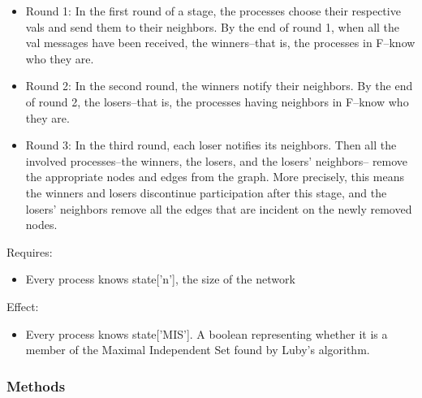 \begin{itemize}
\setlength{\parskip}{0.6ex}
  \item Round 1: In the first round of a stage, the processes choose their 
    respective vals and send them to their neighbors. By the end of round 
    1, when all the val messages have been received, the winners--that is, 
    the processes in F--know who they are.

  \item Round 2: In the second round, the winners notify their neighbors. By 
    the end of round 2, the losers--that is, the processes having neighbors
    in F--know who they are.

  \item Round 3: In the third round, each loser notifies its neighbors. Then 
    all the involved processes--the winners, the losers, and the losers' 
    neighbors-- remove the appropriate nodes and edges from the graph. More
    precisely, this means the winners and losers discontinue participation 
    after this stage, and the losers' neighbors remove all the edges that 
    are incident on the newly removed nodes.

\end{itemize}

Requires:

\begin{itemize}
\setlength{\parskip}{0.6ex}
  \item Every process knows state['n'], the size of the network

\end{itemize}

Effect:

\begin{itemize}
\setlength{\parskip}{0.6ex}
  \item Every process knows state['MIS']. A boolean representing whether it is 
    a member of the Maximal Independent Set found by Luby's algorithm.

\end{itemize}



  \subsubsection{Methods}

